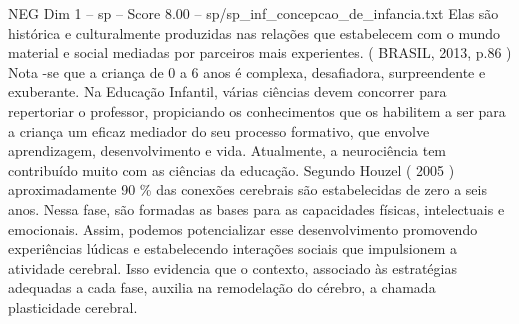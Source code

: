 \begin{textsample}{NEG Dim 1 – sp – Score 8.00 – sp/sp\_inf\_concepcao\_de\_infancia.txt}
Elas são histórica e culturalmente produzidas nas relações que estabelecem com o mundo material e social mediadas por parceiros mais experientes. ( BRASIL, 2013, p.86 ) Nota -se que a criança de 0 a 6 anos é complexa, desafiadora, surpreendente e exuberante.
Na Educação Infantil, várias ciências devem concorrer para repertoriar o professor, propiciando os conhecimentos que os habilitem a ser para a criança um eficaz mediador do seu processo formativo, que envolve aprendizagem, desenvolvimento e vida.
Atualmente, a neurociência tem contribuído muito com as ciências da educação.
Segundo Houzel ( 2005 ) aproximadamente 90 \% das conexões cerebrais são estabelecidas de zero a seis anos.
Nessa fase, são formadas as bases para as capacidades físicas, intelectuais e emocionais.
Assim, podemos potencializar esse desenvolvimento promovendo experiências lúdicas e estabelecendo interações sociais que impulsionem a atividade cerebral.
Isso evidencia que o contexto, associado às estratégias adequadas a cada fase, auxilia na remodelação do cérebro, a chamada plasticidade cerebral.

\end{textsample}
